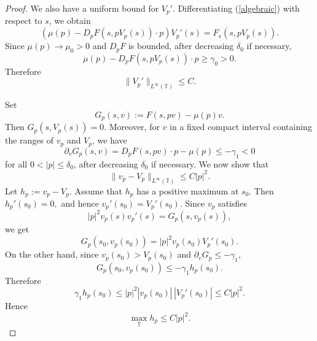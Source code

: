 \documentclass[preprint]{elsarticle}
\numberwithin{equation}{section}
\begin{document}
\begin{proof}
We also have a uniform bound for $V_p'$. Differentiating (\ref{algebraic}) with respect to $s$, we obtain
\begin{equation*}
\left(\mu(p)-D_pF(s,pV_p(s))\cdot p\right)V_p'(s)
=
F_s(s,pV_p(s)).
\end{equation*}
Since $\mu(p)\to\mu_0>0$ and $D_pF$ is bounded, after decreasing $\delta_0$ if necessary,
\begin{equation*}
\mu(p)-D_pF(s,pV_p(s))\cdot p\ge \gamma_0>0.
\end{equation*}
Therefore
\begin{equation*}
\|V_p'\|_{L^\infty(\mathbb T)}\le C.
\end{equation*}

Set
\begin{equation*}
G_p(s,v):=F(s,pv)-\mu(p)v.
\end{equation*}
Then $G_p(s,V_p(s))=0.$
Moreover, for $v$ in a fixed compact interval containing the ranges of $v_p$ and $V_p$, we have
\begin{equation*}
\partial_vG_p(s,v)
=
D_pF(s,pv)\cdot p-\mu(p)
\le
-\gamma_1<0
\end{equation*}
for all $0<|p|\le\delta_0$, after decreasing $\delta_0$ if necessary.
We now show that
\begin{equation*}
\|v_p-V_p\|_{L^\infty(\mathbb T)}\le C|p|^2.
\end{equation*}
Let
$
h_p:=v_p-V_p.
$
Assume that $h_p$ has a positive maximum at $s_0$. Then
$
h_p'(s_0)=0,
$
and hence
$
v_p'(s_0)=V_p'(s_0).
$
Since $v_p$ satisfies
\begin{equation}
|p|^2v_p(s)v_p'(s)=G_p(s,v_p(s)), \label{G_p eqn}
\end{equation}
we get
\begin{equation*}
G_p(s_0,v_p(s_0))
=
|p|^2v_p(s_0)V_p'(s_0).
\end{equation*}
On the other hand, since $v_p(s_0)>V_p(s_0)$ and $\partial_vG_p\le-\gamma_1$,
\begin{equation*}
G_p(s_0,v_p(s_0))
\le
-\gamma_1 h_p(s_0).
\end{equation*}
Therefore
\begin{equation*}
\gamma_1 h_p(s_0)
\le
|p|^2 |v_p(s_0)|\,|V_p'(s_0)|
\le C|p|^2.
\end{equation*}
Hence
\begin{equation*}
\max_{\mathbb T}h_p\le C|p|^2.
\end{equation*}


\end{proof}
\end{document}

